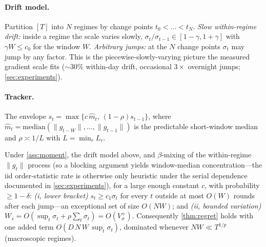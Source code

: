 \documentclass{article}
\newcommand{\norm}[1]{\lVert #1 \rVert}
\newcommand{\gt}{g_t}
\begin{document}
\paragraph{Drift model.} Partition $[T]$ into $N$ regimes by change points
$t_0<\dots<t_N$. \emph{Slow within-regime drift:} inside a regime the scale varies
slowly, $\sigma_t/\sigma_{t-1}\in[1-\gamma,1+\gamma]$ with $\gamma W\le c_0$ for the
window $W$. \emph{Arbitrary jumps:} at the $N$ change points $\sigma_t$ may jump by any
factor. This is the piecewise-slowly-varying picture the measured gradient scale fits
($\sim\!30\%$ within-day drift, occasional $3\times$ overnight jumps; \cref{sec:experiments}).

\paragraph{Tracker.} The envelope $s_t=\max\{c\,\widehat m_t,\,(1-\rho)s_{t-1}\}$, where
$\widehat m_t=\mathrm{median}(\norm{g_{t-W}},\dots,\norm{g_{t-1}})$ is the predictable
short-window median and $\rho\asymp1/L$ with $L=\min_r L_r$.

\begin{proposition}
\label{prop:tracker}
Under \cref{ass:moment}, the drift model above, and $\beta$-mixing of the within-regime
$\norm{\gt}$ process (so a blocking argument yields window-median concentration---the iid
order-statistic rate is otherwise only heuristic under the serial dependence documented in
\cref{sec:experiments}), for a large enough constant $c$, with probability $\ge1-\delta$:
\emph{(i, lower bracket)} $s_t\ge c_1\sigma_t$ for every $t$ outside at most $O(W)$
rounds after each jump---an exceptional set of size $O(NW)$; and
\emph{(ii, bounded variation)} $W_s=O(\sup_t\sigma_t+\rho\sum_t\sigma_t)=O(V_\sigma^+)$.
Consequently \cref{thm:regret} holds with one added term $O(D\,N\,W\,\sup_t\sigma_t)$,
dominated whenever $NW\ll T^{1/p}$ (macroscopic regimes).
\end{proposition}
\end{document}
